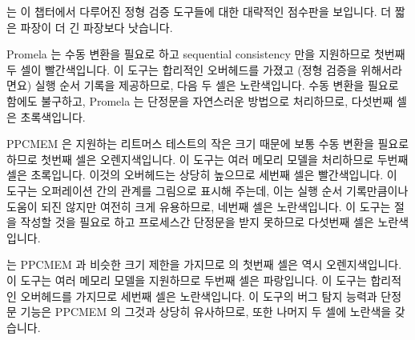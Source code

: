 는 이 챕터에서 다루어진 정형 검증 도구들에 대한 대략적인 점수판을 보입니다.
더 짧은 파장이 더 긴 파장보다 낫습니다.

Promela 는 수동 변환을 필요로 하고 sequential consistency 만을 지원하므로
첫번째 두 셀이 빨간색입니다.
이 도구는 합리적인 오버헤드를 가졌고 (정형 검증을 위해서라면요) 실행 순서
기록을 제공하므로, 다음 두 셀은 노란색입니다.
수동 변환을 필요로 함에도 불구하고, Promela 는 단정문을 자연스러운 방법으로
처리하므로, 다섯번째 셀은 초록색입니다.

PPCMEM 은 지원하는 리트머스 테스트의 작은 크기 때문에 보통 수동 변환을 필요로
하므로 첫번째 셀은 오렌지색입니다.
이 도구는 여러 메모리 모델을 처리하므로 두번째 셀은 초록입니다.
이것의 오버헤드는 상당히 높으므로 세번째 셀은 빨간색입니다.
이 도구는 오퍼레이션 간의 관계를 그림으로 표시해 주는데, 이는 실행 순서
기록만큼이나 도움이 되진 않지만 여전히 크게 유용하므로, 네번째 셀은
노란색입니다.
이 도구는  절을 작성할 것을 필요로 하고 프로세스간 단정문을 받지
못하므로 다섯번째 셀은 노란색입니다.

\iffalse

\Cref{tab:future:Formal Regression Scorecard}
shows a rough-and-ready scorecard for the formal-verification tools
covered in this chapter.
Shorter wavelengths are better than longer wavelengths.

Promela requires hand translation and supports only sequential
consistency, so its first two cells are red.
It has reasonable overhead (for formal verification, anyway)
and provides a traceback, so its next two cells are yellow.
Despite requiring hand translation, Promela handles assertions
in a natural way, so its fifth cell is green.

PPCMEM usually requires hand translation due to the small size of litmus
tests that it supports, so its first cell is orange.
It handles several memory models, so its second cell is green.
Its overhead is quite high, so its third cell is red.
It provides a graphical display of relations among operations, which
is not as helpful as a traceback, but is still quite useful, so its
fourth cell is yellow.
It requires constructing an \co{exists} clause and cannot take
intra-process assertions, so its fifth cell is also yellow.

\fi

 는 PPCMEM 과 비슷한 크기 제한을 가지므로  의 첫번째 셀은
역시 오렌지색입니다.
이 도구는 여러 메모리 모델을 지원하므로 두번째 셀은 파랑입니다.
이 도구는 합리적인 오버헤드를 가지므로 세번째 셀은 노란색입니다.
이 도구의 버그 탐지 능력과 단정문 기능은 PPCMEM 의 그것과 상당히 유사하므로,
 또한 나머지 두 셀에 노란색을 갖습니다.

